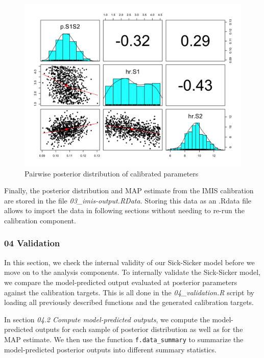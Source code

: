 \documentclass[]{article}
\begin{document}
\begin{figure}
\centering
\includegraphics{../figs/03_posterior-distribution-marginal.png}
\caption{Pairwise posterior distribution of calibrated parameters
\label{fig:03_posterior-distribution-marginal}}
\end{figure}

Finally, the posterior distribution and MAP estimate from the IMIS
calibration are stored in the file \emph{03\_imis-output.RData}. Storing
this data as an .Rdata file allows to import the data in following
sections without needing to re-run the calibration component.

\subsubsection{04 Validation}\label{validation}

In this section, we check the internal validity of our Sick-Sicker model
before we move on to the analysis components. To internally validate the
Sick-Sicker model, we compare the model-predicted output evaluated at
posterior parameters against the calibration targets. This is all done
in the \emph{04\_validation.R} script by loading all previously
described functions and the generated calibration targets.

In section \emph{04.2 Compute model-predicted outputs}, we compute the
model-predicted outputs for each sample of posterior distribution as
well as for the MAP estimate. We then use the function
\texttt{f.data\_summary} to summarize the model-predicted posterior
outputs into different summary statistics.
\end{document}
